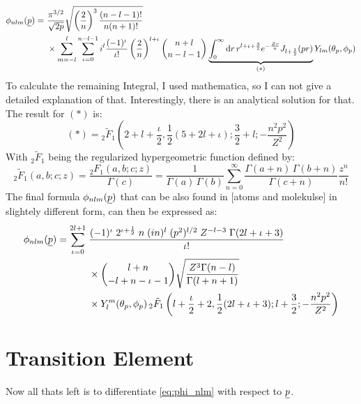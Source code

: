 \begin{align*}
    \phi_{nlm}(\underline{p}) =\ & \frac{\pi^{3/2}}{\sqrt{2p}}\sqrt{\left(\frac{2}{n}\right)^3\frac{(n-l-1)!}{n(n+1)!}}\\
    & \times \sum_{m=-l}^{l}\sum_{\iota=0}^{n-l-1}i^l\frac{(-1)^{\iota}}{\iota!}\left(\frac{2}{n}\right)^{l+\iota}\binom{n+l}{n-l-1}\underbrace{\int_{0}^{\infty}\mathrm{d} r\,r^{l+\iota+\frac{3}{2}}e^{-\frac{Zr}{n}}J_{l+\frac{1}{2}}(pr)}_{(*)} Y_{lm}(\theta_p,\phi_p)
\end{align*}
To calculate the remaining Integral, I used mathematica, so I can not give a detailed explanation of that. Interestingly, there is an analytical solution for that. 
The result for $(*)$ is:
\begin{equation*}
    (*) = {}_2\tilde{F}_1\left(2 + l + \frac{\iota}{2}, \frac{1}{2}(5 + 2l + \iota); \frac{3}{2} + l; -\frac{n^2 p^2}{Z^2}\right)
\end{equation*}
With ${}_2\tilde{F}_1$ being the regularized hypergeometric function defined by:
\begin{equation*}
    {}_2\tilde{F}_1(a,b;c;z) = \frac{{}_2F_1(a,b;c;z)}{\Gamma(c)} = \frac{1}{\Gamma(a)\,\Gamma(b)} \sum_{n=0}^{\infty} \frac{\Gamma(a+n)\,\Gamma(b+n)}{\Gamma(c+n)} \frac{z^n}{n!}
\end{equation*}
The final formula $\phi_{nlm}(\underline{p})$ that can be also found in [atoms and molekulse] in slightely different form, can then be expressed as:
\begin{align}
    \label{eq:phi_nlm}
    \phi_{nlm}(\underline{p}) = \sum_{\iota=0}^{2l+1} \;
        & \frac{(-1)^{\iota} \; 2^{\iota + \frac{1}{2}} \; n \; (i n)^l \; (p^2)^{l/2} \; Z^{-l-3} \; \Gamma(2l+\iota+3)}{\iota!} \nonumber \\
        & \times \binom{l+n}{-l+n-\iota-1} 
        \sqrt{\frac{Z^3 \Gamma(n-l)}{\Gamma(l+n+1)}} \nonumber \\
        & \times Y_l^m(\theta_p, \phi_p) \,
        {}_2\tilde{F}_1\left(l+\frac{\iota}{2}+2, \frac{1}{2}(2l+\iota+3); l+\frac{3}{2}; -\frac{n^2 p^2}{Z^2}\right)
\end{align}








\section*{Transition Element}
Now all thats left is to differentiate \eqref{eq:phi_nlm} with respect to $\underline{p}$. 


